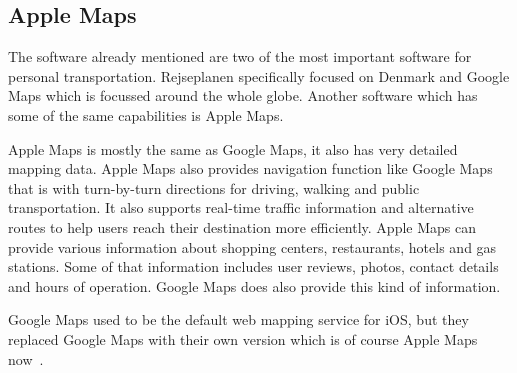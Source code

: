 \subsection{Apple Maps}\label{subsec:apple-maps}

The software already mentioned are two of the most important software for personal transportation.
Rejseplanen specifically focused on Denmark and Google Maps which is focussed around the whole globe.
Another software which has some of the same capabilities is Apple Maps.

Apple Maps is mostly the same as Google Maps, it also has very detailed mapping data.
Apple Maps also provides navigation function like Google Maps that is with turn-by-turn directions for driving, walking
and public transportation.
It also supports real-time traffic information and alternative routes to help users reach their destination more
efficiently.
Apple Maps can provide various information about shopping centers, restaurants, hotels and gas stations.
Some of that information includes user reviews, photos, contact details and hours of operation.
Google Maps does also provide this kind of information.

Google Maps used to be the default web mapping service for iOS, but they replaced Google Maps with their own version
which is of course Apple Maps now~\cite{applemaps2023}.
